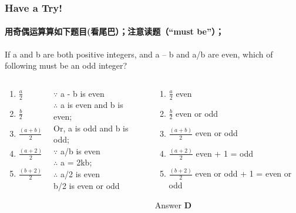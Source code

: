 \documentclass[
	11pt, %
	handout,
]{beamer}
\begin{document}
\begin{frame}
	\frametitle{Have a Try!}
	\framesubtitle{用奇偶运算算如下题目(看尾巴）；注意读题（“must be”）；}
If a and b are both positive integers, and a – b and a/b are even, which of following must be an odd integer?\\
	\begin{columns}[t] %
		\begin{column}{0.2\textwidth} %
		 \begin{enumerate}[A]
				 \item $\frac{a}{2}$\\
				 \item $\frac{b}{2}$\\
				 \item $\frac{(a + b)}{2}$\\
				 \item $\frac{(a + 2)}{2}$\\
				 \item $\frac{(b + 2)}{2}$\\
      \end{enumerate}
		\end{column}

\begin{column}{0.4\textwidth}
\pause
$\because$ a - b is even \\
$\therefore$ a is even and b is even; \\ 
Or, a is odd and b is odd; \\ 

\bigskip
$\because$ a/b is even \\
 $\therefore$ a = 2kb; \\
$\therefore$ a/2 is even\\
b/2 is even or odd\\
\end{column}

\begin{column}{0.4\textwidth} %
		\pause 
	 \begin{enumerate}[A]
		 \item $\frac{a}{2}$ even
		 \item $\frac{b}{2}$ even or odd
		 \item $\frac{(a + b)}{2}$ even or odd
		 \item $\frac{(a + 2)}{2}$ even + 1 = odd
		 \item $\frac{(b + 2)}{2}$ even or odd + 1 = even or odd
  \end{enumerate}

\bigskip
Answer \textbf{D}
\end{column}
\end{columns}

\end{frame}
\end{document}
